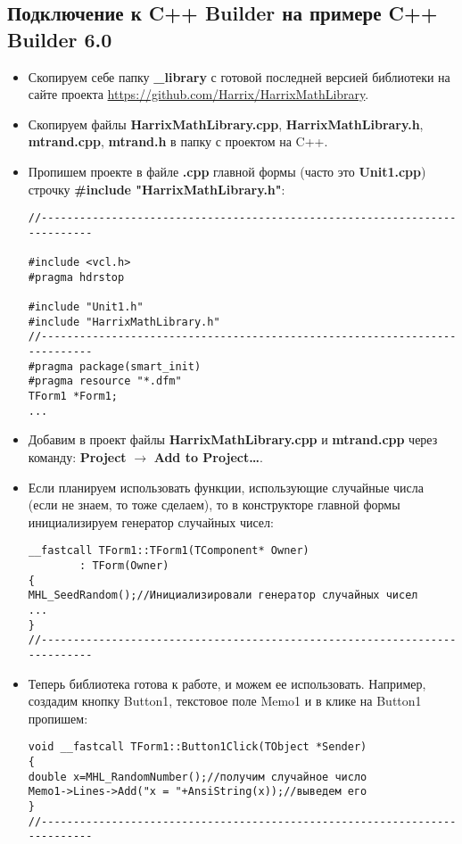 \documentclass[a4paper,12pt]{article}
\begin{document}
\subsection{Подключение к C++ Builder на примере C++ Builder 6.0}
\begin{itemize}
\item Скопируем себе папку \textbf{\_library} с готовой последней версией библиотеки на сайте проекта \href{https://github.com/Harrix/HarrixMathLibrary}{https://github.com/Harrix/HarrixMathLibrary}.

\item Скопируем файлы \textbf{HarrixMathLibrary.cpp}, \textbf{HarrixMathLibrary.h}, \textbf{mtrand.cpp}, \textbf{mtrand.h} в папку с проектом на C++.

\item Пропишем проекте в файле \textbf{.cpp} главной формы (часто это \textbf{Unit1.cpp}) строчку \textbf{\#include "HarrixMathLibrary.h"}:
\begin{lstlisting}[label=install_code_01,caption=Подключение библиотеки]
//---------------------------------------------------------------------------

#include <vcl.h>
#pragma hdrstop

#include "Unit1.h"
#include "HarrixMathLibrary.h"
//---------------------------------------------------------------------------
#pragma package(smart_init)
#pragma resource "*.dfm"
TForm1 *Form1;
...
\end{lstlisting}

\item Добавим в проект файлы \textbf{HarrixMathLibrary.cpp} и \textbf{mtrand.cpp} через команду: \textbf{Project} $\rightarrow$ \textbf{Add to Project\dots}.

\item Если планируем использовать функции, использующие случайные числа (если не знаем, то тоже сделаем), то в конструкторе главной формы инициализируем генератор случайных чисел:
\begin{lstlisting}[label=install_code_02,caption=Инициализация генератора случайных чисел]
__fastcall TForm1::TForm1(TComponent* Owner)
        : TForm(Owner)
{
MHL_SeedRandom();//Инициализировали генератор случайных чисел
...
}
//---------------------------------------------------------------------------
\end{lstlisting}

\item Теперь библиотека готова к работе, и можем ее использовать. Например, создадим кнопку Button1, текстовое поле Memo1 и в клике на Button1 пропишем:
\begin{lstlisting}[label=install_code_03,caption=Пример использования]
void __fastcall TForm1::Button1Click(TObject *Sender)
{
double x=MHL_RandomNumber();//получим случайное число
Memo1->Lines->Add("x = "+AnsiString(x));//выведем его
}
//---------------------------------------------------------------------------
\end{lstlisting}
\end{itemize}
\end{document}
